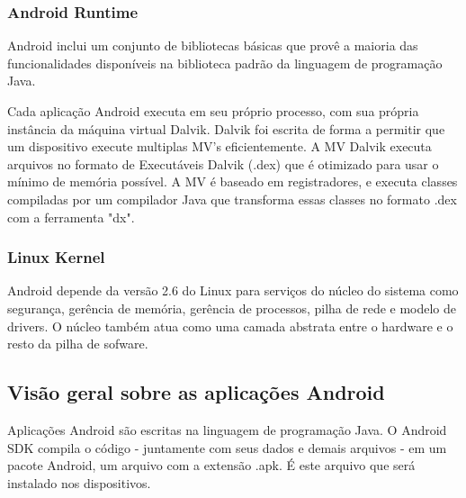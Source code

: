 \subsubsection{Android Runtime}

Android inclui um conjunto de bibliotecas básicas que provê a maioria das funcionalidades
disponíveis na biblioteca padrão da linguagem de programação Java.

Cada aplicação Android executa em seu próprio processo, com sua própria instância 
da máquina virtual Dalvik. Dalvik foi escrita de forma a permitir que um dispositivo
execute multiplas MV's eficientemente. A MV Dalvik executa arquivos no formato de 
Executáveis Dalvik (.dex) que é otimizado para usar o mínimo de memória possível. 
A MV é baseado em registradores, e executa classes compiladas por um compilador Java 
que transforma essas classes no formato .dex com a ferramenta "dx".

\subsubsection{Linux Kernel}

Android depende da versão 2.6 do Linux para serviços do núcleo do sistema como 
segurança, gerência de memória, gerência de processos, pilha de rede e modelo de 
drivers. O núcleo também atua como uma camada abstrata entre o hardware e o resto
da pilha de sofware.

\subsection{Visão geral sobre as aplicações Android}

Aplicações Android são escritas na linguagem de programação Java. O Android SDK
 compila o código - juntamente com seus dados e demais arquivos - em um pacote 
 Android, um arquivo com a extensão .apk. É este arquivo que será instalado nos 
 dispositivos.


